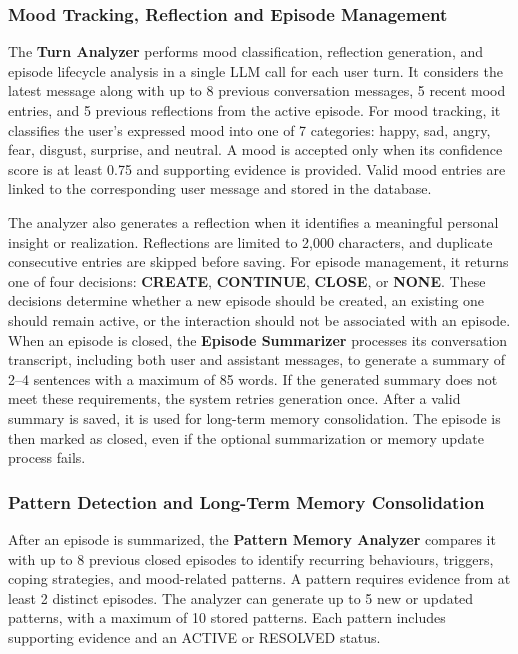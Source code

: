\documentclass[conference]{IEEEtran}
\begin{document}
\subsubsection{Mood Tracking, Reflection and Episode Management}
The \textbf{Turn Analyzer} performs mood classification, reflection generation, and episode lifecycle analysis in a single LLM call for each user turn. It considers the latest message along with up to 8 previous conversation messages, 5 recent mood entries, and 5 previous reflections from the active episode. For mood tracking, it classifies the user's expressed mood into one of 7 categories: happy, sad, angry, fear, disgust, surprise, and neutral. A mood is accepted only when its confidence score is at least 0.75 and supporting evidence is provided. Valid mood entries are linked to the corresponding user message and stored in the database.

The analyzer also generates a reflection when it identifies a meaningful personal insight or realization. Reflections are limited to 2,000 characters, and duplicate consecutive entries are skipped before saving. For episode management, it returns one of four decisions: \textbf{CREATE}, \textbf{CONTINUE}, \textbf{CLOSE}, or \textbf{NONE}. These decisions determine whether a new episode should be created, an existing one should remain active, or the interaction should not be associated with an episode. When an episode is closed, the \textbf{Episode Summarizer} processes its conversation transcript, including both user and assistant messages, to generate a summary of 2--4 sentences with a maximum of 85 words. If the generated summary does not meet these requirements, the system retries generation once. After a valid summary is saved, it is used for long-term memory consolidation. The episode is then marked as closed, even if the optional summarization or memory update process fails.

\subsubsection{Pattern Detection and Long-Term Memory Consolidation}
After an episode is summarized, the \textbf{Pattern Memory Analyzer} compares it with up to 8 previous closed episodes to identify recurring behaviours, triggers, coping strategies, and mood-related patterns. A pattern requires evidence from at least 2 distinct episodes. The analyzer can generate up to 5 new or updated patterns, with a maximum of 10 stored patterns. Each pattern includes supporting evidence and an ACTIVE or RESOLVED status.
\end{document}
